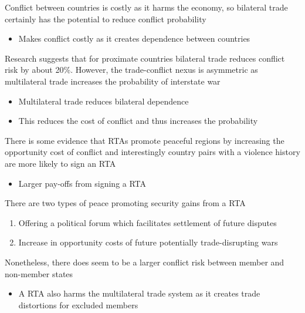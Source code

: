 \documentclass{beamer}
\begin{document}
\begin{frame}
  Conflict between countries is costly as it harms the economy, so bilateral trade certainly has the potential to reduce conflict probability
  \begin{itemize}
    \item Makes conflict costly as it creates dependence between countries    
  \end{itemize}
  \medskip
  Research suggests that for proximate countries bilateral trade reduces conflict risk by about 20\%.
  However, the trade-conflict nexus is asymmetric as multilateral trade increases the probability of interstate war
  \begin{itemize}
    \item Multilateral trade reduces bilateral dependence
    \item This reduces the cost of conflict and thus increases the probability
  \end{itemize}
\end{frame}

\begin{frame}
  There is some evidence that RTAs promote peaceful regions by increasing the opportunity cost of conflict and interestingly country pairs with a violence history are more likely to sign an RTA
  \begin{itemize}
    \item Larger pay-offs from signing a RTA
  \end{itemize}
  \medskip
  There are two types of peace promoting security gains from a RTA
  \begin{enumerate}
    \item Offering a political forum which facilitates settlement of future disputes
    \item Increase in opportunity costs of future potentially trade-disrupting wars
  \end{enumerate}
  \medskip
  Nonetheless, there does seem to be a larger conflict risk between member and non-member states
  \begin{itemize}
    \item A RTA also harms the multilateral trade system as it creates trade distortions for excluded members
  \end{itemize}
\end{frame}


\end{document}
